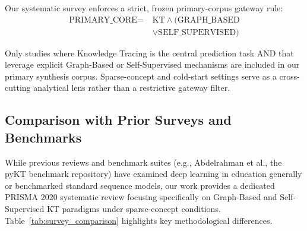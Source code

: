 \documentclass[10pt,journal,compsoc]{IEEEtran}
\begin{document}
Our systematic survey enforces a strict, frozen primary-corpus gateway rule:
\begin{equation}
\begin{split}
\text{PRIMARY\_CORE} = \; & \text{KT} \land (\text{GRAPH\_BASED} \\
& \lor \text{SELF\_SUPERVISED})
\end{split}
\end{equation}

Only studies where Knowledge Tracing is the central prediction task AND that leverage explicit Graph-Based or Self-Supervised mechanisms are included in our primary synthesis corpus. Sparse-concept and cold-start settings serve as a cross-cutting analytical lens rather than a restrictive gateway filter.

\subsection{Comparison with Prior Surveys and Benchmarks}
While previous reviews and benchmark suites (e.g., Abdelrahman et al., the pyKT benchmark repository) have examined deep learning in education generally or benchmarked standard sequence models, our work provides a dedicated PRISMA 2020 systematic review focusing specifically on Graph-Based and Self-Supervised KT paradigms under sparse-concept conditions. Table~\ref{tab:survey_comparison} highlights key methodological differences.

\begin{table}[t]
\caption{Comparison with Prior Knowledge Tracing Reviews and Benchmark Suites}
\label{tab:survey_comparison}
\centering
{}
\end{table}
\end{document}
